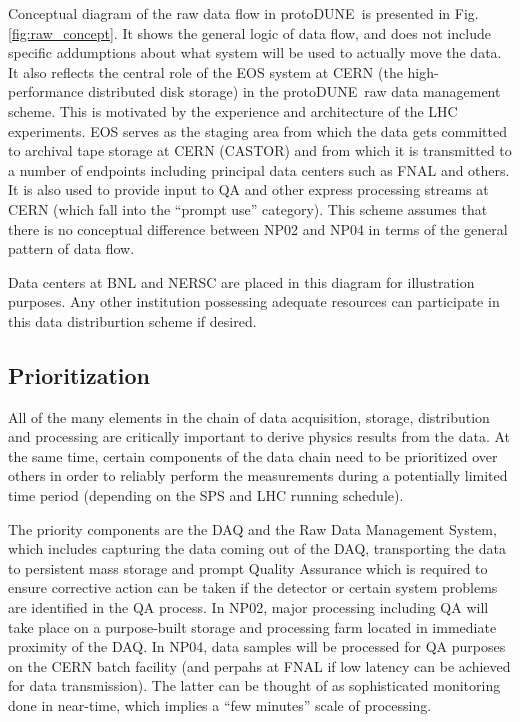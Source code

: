 \documentclass[pdftex,12pt,letter]{article}
\newcommand{\pd}{protoDUNE\ }
\begin{document}
\noindent
Conceptual diagram of the raw data flow in \pd is presented in Fig.\ref{fig:raw_concept}. It shows the general logic
of data flow, and does not include specific addumptions about what system will be used to actually move the data.
It also reflects the central role of the EOS
system at CERN (the high-performance distributed disk storage) in the \pd raw data management scheme. This is motivated by the experience
and architecture of the LHC experiments. EOS serves as the staging area from which the data gets committed to archival tape storage at
CERN (CASTOR) and from which it is transmitted to a number of endpoints including principal data centers such as FNAL and others.
It is also used to provide input to QA and other express processing streams at CERN (which fall into the ``prompt use'' category).
This scheme assumes that there is no conceptual difference between NP02 and NP04 in terms of the general pattern of data flow.

Data centers at BNL and NERSC are placed in this diagram for illustration purposes. Any other institution possessing adequate
resources can participate in this data distriburtion scheme if desired.


\subsection{Prioritization}

All of the many elements in the chain of data acquisition, storage, distribution and processing are critically important to derive physics results  from the data.
At the same time, certain components of the data chain need to be prioritized over others in order to reliably perform the measurements during a potentially
limited time period (depending on the SPS and LHC running schedule).

The priority components are the DAQ and the Raw Data Management System, which includes capturing the data coming out of the DAQ,
transporting the data to persistent mass storage and prompt Quality Assurance which is required to ensure corrective action can be taken
if the detector or certain system problems are identified in the QA process. In NP02, major processing including QA will take place on a purpose-built
storage and processing farm located in immediate proximity of the DAQ. In NP04, data samples will be processed for QA purposes on the CERN batch
facility (and perpahs at FNAL if low latency can be achieved for data transmission). The latter can be thought of as sophisticated monitoring done in
near-time, which implies a ``few minutes'' scale of processing.
\end{document}
